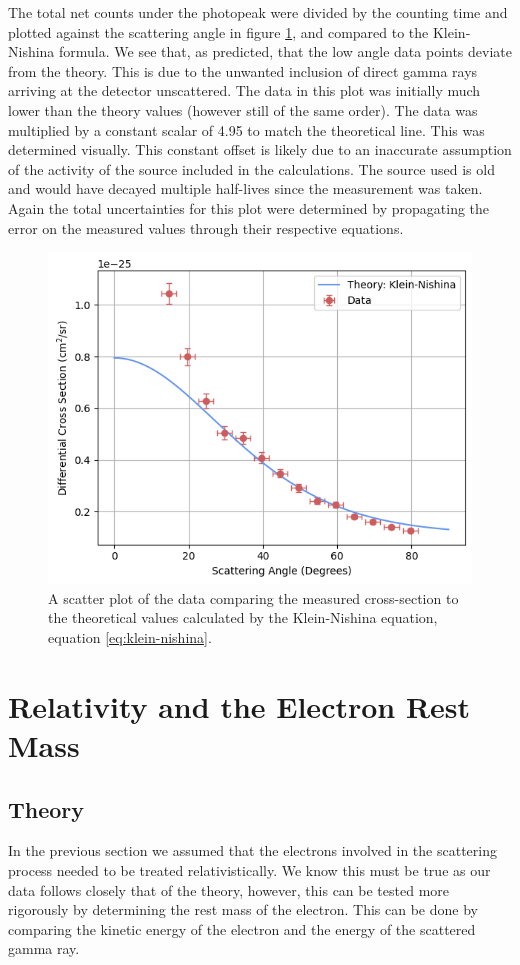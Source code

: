 \documentclass[%
reprint,
amsmath,amssymb,
aps,
floatfix
]{revtex4-2}
\begin{document}
			The total net counts under the photopeak were divided by the counting time and plotted against the scattering angle in figure \ref{fig:crossSectionPlot}, and compared to the Klein-Nishina formula. We see that, as predicted, that the low angle data points deviate from the theory. This is due to the unwanted inclusion of direct gamma rays arriving at the detector unscattered. The data in this plot was initially much lower than the theory values (however still of the same order). The data was multiplied by a constant scalar of 4.95 to match the theoretical line. This was determined visually. This constant offset is likely due to an inaccurate assumption of the activity of the source included in the calculations. The source used is old and would have decayed multiple half-lives since the measurement was taken. Again the total uncertainties for this plot were determined by propagating the error on the measured values through their respective equations.\\
			
			\begin{figure}
				\includegraphics[width=0.85\columnwidth]{crossSectionPlot.png}
				\caption{\label{fig:crossSectionPlot}A scatter plot of the data comparing the measured cross-section to the theoretical values calculated by the Klein-Nishina equation, equation \ref{eq:klein-nishina}.}
			\end{figure}
		
	\section{Relativity and the Electron Rest Mass}	
		
		\subsection{Theory}
			In the previous section we assumed that the electrons involved in the scattering process needed to be treated relativistically. We know this must be true as our data follows closely that of the theory, however, this can be tested more rigorously by determining the rest mass of the electron. This can be done by comparing the kinetic energy of the electron and the energy of the scattered gamma ray.\\
\end{document}
